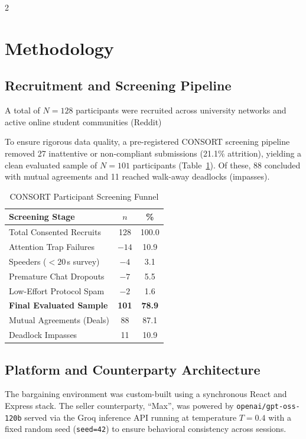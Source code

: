 \documentclass[10pt,a4paper]{article}
\begin{document}
\begin{multicols}{2}
\section{Methodology}

\subsection{Recruitment and Screening Pipeline}

A total of $N = 128$ participants were recruited across university networks and active online student communities (Reddit)

To ensure rigorous data quality, a pre-registered CONSORT screening pipeline removed 27 inattentive or non-compliant submissions (21.1\% attrition), yielding a clean evaluated sample of $N = 101$ participants (Table~\ref{tab:funnel}). Of these, 88 concluded with mutual agreements and 11 reached walk-away deadlocks (impasses).

\begin{table}[H]
\centering
\scriptsize
\caption{CONSORT Participant Screening Funnel}
\label{tab:funnel}
\setlength{\tabcolsep}{5pt}
\renewcommand{\arraystretch}{1.15}
\begin{tabular}{@{}lcc@{}}
\toprule
\textbf{Screening Stage} & $n$ & \% \\
\midrule
Total Consented Recruits   & 128  & 100.0 \\
Attention Trap Failures    & $-14$ & 10.9 \\
Speeders ($<20$\,s survey) & $-4$  & 3.1  \\
Premature Chat Dropouts    & $-7$  & 5.5  \\
Low-Effort Protocol Spam   & $-2$  & 1.6  \\
\midrule
\textbf{Final Evaluated Sample} & \textbf{101} & \textbf{78.9} \\
\quad Mutual Agreements (Deals) & 88   & 87.1 \\
\quad Deadlock Impasses         & 11   & 10.9 \\
\bottomrule
\end{tabular}
\end{table}

\subsection{Platform and Counterparty Architecture}

The bargaining environment was custom-built using a synchronous React and Express stack. The seller counterparty, ``Max'', was powered by \texttt{openai/gpt-oss-120b} served via the Groq inference API running at temperature $T = 0.4$ with a fixed random seed (\texttt{seed=42}) to ensure behavioral consistency across sessions.


\end{multicols}
\end{document}
